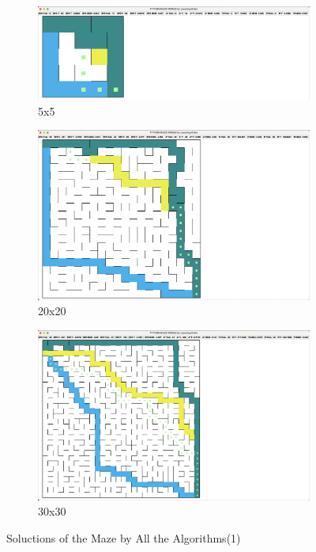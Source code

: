 \documentclass{article}
\begin{document}
\begin{figure}[htp]
    \centering
    \begin{subfigure}[b]{1\textwidth}
        \centering
        \includegraphics[width=\textwidth]{imgs/s_5.eps}
        \caption{5x5}
    \end{subfigure}
    \newline
    \begin{subfigure}[b]{1\textwidth}
        \centering
        \includegraphics[width=\textwidth]{imgs/s_20.eps}
        \caption{20x20}
    \end{subfigure}
    \newline
    \begin{subfigure}[b]{1\textwidth}
        \centering
        \includegraphics[width=\textwidth]{imgs/s_30.eps}
        \caption{30x30}
    \end{subfigure}
    \caption{Soluctions of the Maze by All the Algorithms(1)}
\end{figure}
\end{document}
